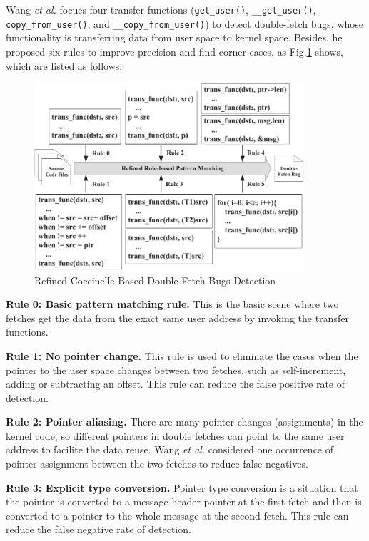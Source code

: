 \documentclass[10pt]{llncs}
\begin{document}
Wang \textit{et al.} focues four transfer functions (\verb:get_user():, \verb:__get_user():, \verb:copy_from_user():, and \verb:__copy_from_user():) to detect double-fetch bugs, whose functionality is transferring data from user space to kernel space. Besides, he proposed six rules to improve precision and find corner cases, as Fig.\ref{Cocci} shows, which are listed as follows:


\begin{figure}
  \centering
  \includegraphics[width=10cm]{refined}
  \caption{Refined Coccinelle-Based Double-Fetch Bugs Detection~\cite{wang}}
  \label{Cocci}
\end{figure}


\textbf{Rule 0: Basic pattern matching rule.}
This is the basic scene where two fetches get the data from the exact same user address by invoking the transfer functions. %

\textbf{Rule 1: No pointer change.}
This rule is used to eliminate the cases when the pointer to the user space changes between two fetches, such as self-increment, adding or subtracting an offset. This rule can reduce the false positive rate of detection.

\textbf{Rule 2: Pointer aliasing.}
There are many pointer changes (assignments) in the kernel code, so different pointers in double fetches can point to the same user address to facilite the data reuse. Wang \textit{et al.} considered one occurrence of pointer assignment between the two fetches to reduce false negatives.

\textbf{Rule 3: Explicit type conversion.}
Pointer type conversion is a situation that the pointer is converted to a message header pointer at the first fetch and then is converted to a pointer to the whole message at the second fetch. This rule can reduce the false negative rate of detection.
\end{document}
